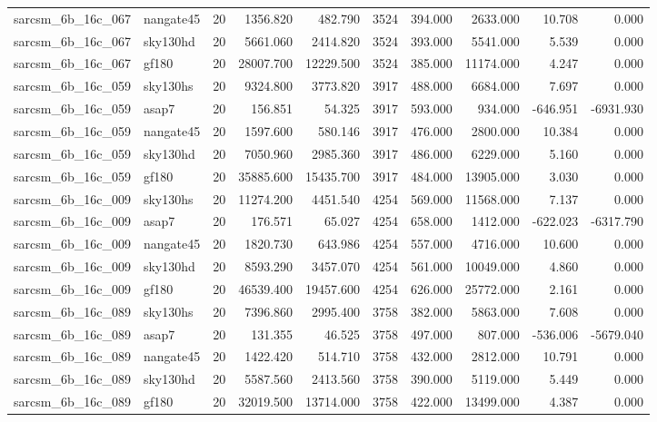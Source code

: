 \begin{longtable}{llrrrrrrrr}
sarcsm\_6b\_16c\_067 & nangate45 & 20 & 1356.820 & 482.790 & 3524 & 394.000 & 2633.000 & 10.708 & 0.000 \\
sarcsm\_6b\_16c\_067 & sky130hd & 20 & 5661.060 & 2414.820 & 3524 & 393.000 & 5541.000 & 5.539 & 0.000 \\
sarcsm\_6b\_16c\_067 & gf180 & 20 & 28007.700 & 12229.500 & 3524 & 385.000 & 11174.000 & 4.247 & 0.000 \\
sarcsm\_6b\_16c\_059 & sky130hs & 20 & 9324.800 & 3773.820 & 3917 & 488.000 & 6684.000 & 7.697 & 0.000 \\
sarcsm\_6b\_16c\_059 & asap7 & 20 & 156.851 & 54.325 & 3917 & 593.000 & 934.000 & -646.951 & -6931.930 \\
sarcsm\_6b\_16c\_059 & nangate45 & 20 & 1597.600 & 580.146 & 3917 & 476.000 & 2800.000 & 10.384 & 0.000 \\
sarcsm\_6b\_16c\_059 & sky130hd & 20 & 7050.960 & 2985.360 & 3917 & 486.000 & 6229.000 & 5.160 & 0.000 \\
sarcsm\_6b\_16c\_059 & gf180 & 20 & 35885.600 & 15435.700 & 3917 & 484.000 & 13905.000 & 3.030 & 0.000 \\
sarcsm\_6b\_16c\_009 & sky130hs & 20 & 11274.200 & 4451.540 & 4254 & 569.000 & 11568.000 & 7.137 & 0.000 \\
sarcsm\_6b\_16c\_009 & asap7 & 20 & 176.571 & 65.027 & 4254 & 658.000 & 1412.000 & -622.023 & -6317.790 \\
sarcsm\_6b\_16c\_009 & nangate45 & 20 & 1820.730 & 643.986 & 4254 & 557.000 & 4716.000 & 10.600 & 0.000 \\
sarcsm\_6b\_16c\_009 & sky130hd & 20 & 8593.290 & 3457.070 & 4254 & 561.000 & 10049.000 & 4.860 & 0.000 \\
sarcsm\_6b\_16c\_009 & gf180 & 20 & 46539.400 & 19457.600 & 4254 & 626.000 & 25772.000 & 2.161 & 0.000 \\
sarcsm\_6b\_16c\_089 & sky130hs & 20 & 7396.860 & 2995.400 & 3758 & 382.000 & 5863.000 & 7.608 & 0.000 \\
sarcsm\_6b\_16c\_089 & asap7 & 20 & 131.355 & 46.525 & 3758 & 497.000 & 807.000 & -536.006 & -5679.040 \\
sarcsm\_6b\_16c\_089 & nangate45 & 20 & 1422.420 & 514.710 & 3758 & 432.000 & 2812.000 & 10.791 & 0.000 \\
sarcsm\_6b\_16c\_089 & sky130hd & 20 & 5587.560 & 2413.560 & 3758 & 390.000 & 5119.000 & 5.449 & 0.000 \\
sarcsm\_6b\_16c\_089 & gf180 & 20 & 32019.500 & 13714.000 & 3758 & 422.000 & 13499.000 & 4.387 & 0.000 \\

\end{longtable}
